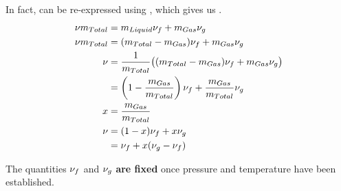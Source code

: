 In fact,  can be re-expressed using , which gives us .
\begin{align*}
  \nu m_{Total} &= m_{Liquid} \nu_{f} + m_{Gas} \nu_{g} \\
  \nu m_{Total} &= (m_{Total} - m_{Gas}) \nu_{f} + m_{Gas} \nu_{g} \\
  \nu &= \frac{1}{m_{Total}} \bigl( (m_{Total} - m_{Gas}) \nu_{f} + m_{Gas} \nu_{g} \bigr) \\
                                &= \left( 1 - \frac{m_{Gas}}{m_{Total}} \right) \nu_{f} + \frac{m_{Gas}}{m_{Total}} \nu_{g} \\
  x &= \frac{m_{Gas}}{m_{Total}} \\
  \nu &= (1 - x) \nu_{f} + x \nu_{g} \\
  &= \nu_{f} + x (\nu_{g} - \nu_{f})
\end{align*}

The quantities $\nu_{f}$ and $\nu_{g}$ \textbf{are fixed} once pressure and temperature have been established.

